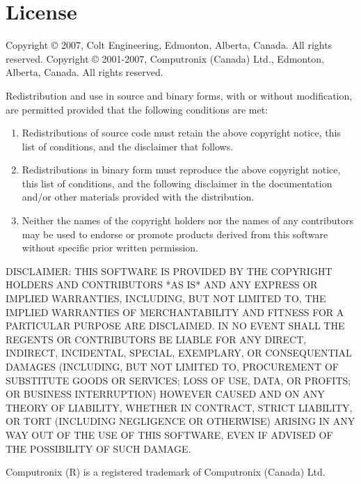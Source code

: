 \chapter{License}\label{license}

\centerline{}

Copyright \copyright{} 2007, Colt Engineering, Edmonton, Alberta, Canada.
All rights reserved.\break
Copyright \copyright{} 2001-2007, Computronix (Canada) Ltd., Edmonton, Alberta, Canada.
All rights reserved.

Redistribution and use in source and binary forms, with or without
modification, are permitted provided that the following conditions are met:

\begin{enumerate}
\item
    Redistributions of source code must retain the above copyright notice,
    this list of conditions, and the disclaimer that follows.

\item
    Redistributions in binary form must reproduce the above copyright
    notice, this list of conditions, and the following disclaimer in the
    documentation and/or other materials provided with the distribution.

\item
    Neither the names of the copyright holders nor the names of any
    contributors may be used to endorse or promote products derived from this
    software without specific prior written permission.
\end{enumerate}

DISCLAIMER:
THIS SOFTWARE IS PROVIDED BY THE COPYRIGHT HOLDERS AND CONTRIBUTORS *AS IS*
AND ANY EXPRESS OR IMPLIED WARRANTIES, INCLUDING, BUT NOT LIMITED TO,
THE IMPLIED WARRANTIES OF MERCHANTABILITY AND FITNESS FOR A
PARTICULAR PURPOSE ARE DISCLAIMED. IN NO EVENT SHALL THE REGENTS
OR CONTRIBUTORS BE LIABLE FOR ANY DIRECT, INDIRECT, INCIDENTAL,
SPECIAL, EXEMPLARY, OR CONSEQUENTIAL DAMAGES (INCLUDING, BUT NOT
LIMITED TO, PROCUREMENT OF SUBSTITUTE GOODS OR SERVICES; LOSS OF
USE, DATA, OR PROFITS; OR BUSINESS INTERRUPTION) HOWEVER CAUSED
AND ON ANY THEORY OF LIABILITY, WHETHER IN CONTRACT, STRICT LIABILITY,
OR TORT (INCLUDING NEGLIGENCE OR OTHERWISE) ARISING IN ANY WAY OUT
OF THE USE OF THIS SOFTWARE, EVEN IF ADVISED OF THE POSSIBILITY OF
SUCH DAMAGE.

Computronix (R) is a registered trademark of Computronix (Canada) Ltd.

